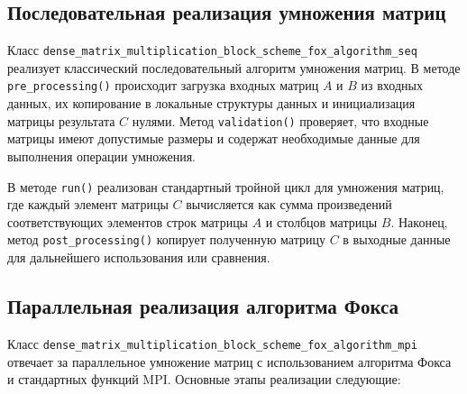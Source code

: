 \documentclass{report}
\begin{document}
\subsection*{Последовательная реализация умножения матриц}

Класс \texttt{dense\_matrix\_multiplication\_block\_scheme\_fox\_algorithm\_seq} реализует классический последовательный алгоритм умножения матриц. В методе \texttt{pre\_processing()} происходит загрузка входных матриц $A$ и $B$ из входных данных, их копирование в локальные структуры данных и инициализация матрицы результата $C$ нулями. Метод \texttt{validation()} проверяет, что входные матрицы имеют допустимые размеры и содержат необходимые данные для выполнения операции умножения.

В методе \texttt{run()} реализован стандартный тройной цикл для умножения матриц, где каждый элемент матрицы $C$ вычисляется как сумма произведений соответствующих элементов строк матрицы $A$ и столбцов матрицы $B$. Наконец, метод \texttt{post\_processing()} копирует полученную матрицу $C$ в выходные данные для дальнейшего использования или сравнения.
\newpage
\subsection*{Параллельная реализация алгоритма Фокса}

Класс \texttt{dense\_matrix\_multiplication\_block\_scheme\_fox\_algorithm\_mpi} отвечает за параллельное умножение матриц с использованием алгоритма Фокса и стандартных функций MPI. Основные этапы реализации следующие:
\end{document}
